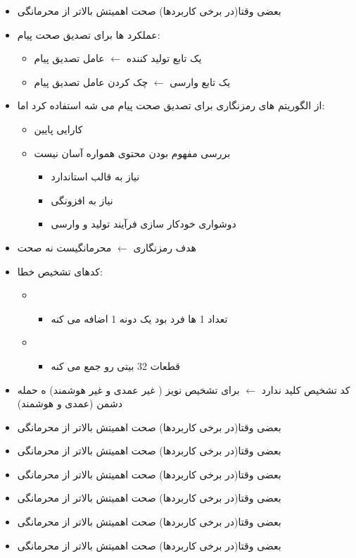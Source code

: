 \documentclass{report}
\begin{document}
	\begin{itemize}
		\item 
		بعضی وقتا(در برخی کاربردها) صحت اهمیتش بالاتر از محرمانگی
		\item 
عملکرد ها برای تصدیق صحت پیام:
			\begin{itemize}
				 \item 
				یک تابع تولید کننده 
				$\leftarrow$
				 عامل تصدیق پیام
				 \item
				 یک تابع وارسی
				 $\leftarrow$
				 چک کردن عامل تصدیق پیام
				
			\end{itemize}
		\item 
			از الگوریتم های رمزنگاری برای تصدیق صحت پیام می شه استفاده کرد اما:
				\begin{itemize}
					\item 
					کارایی پایین
					\item
					 بررسی مفهوم بودن محتوی همواره آسان نیست
					 	\begin{itemize}
					 		\item 
					 		نیاز به قالب استاندارد
					 		\item 
					 		نیاز به افزونگی
					 		\item 
					 		دوشواری خودکار سازی فرآیند تولید و وارسی
					 	\end{itemize}
				\end{itemize}
		\item 
			هدف رمزنگاری
			$\leftarrow$
			محرمانگیست نه صحت
		\item 
			کدهای تشخیص خطا:
			\begin{itemize}
				\item {}	
					\begin{itemize}
						\item 
						تعداد 1 ها فرد بود یک دونه 1 اضافه می کنه
					\end{itemize}
				\item {}
					\begin{itemize}
						\item 
						قطعات 32 بیتی رو جمع می کنه
					\end{itemize}
			\end{itemize}
		\item 
		کد تشخیص کلید ندارد
		$\leftarrow$
		برای تشخیص نویز ( غیر عمدی و غیر هوشمند) ه حمله دشمن (عمدی و هوشمند)
		\item 
			بعضی وقتا(در برخی کاربردها) صحت اهمیتش بالاتر از محرمانگی
		\item 
			بعضی وقتا(در برخی کاربردها) صحت اهمیتش بالاتر از محرمانگی
		\item 
			بعضی وقتا(در برخی کاربردها) صحت اهمیتش بالاتر از محرمانگی
		\item 
			بعضی وقتا(در برخی کاربردها) صحت اهمیتش بالاتر از محرمانگی
		\item 
			بعضی وقتا(در برخی کاربردها) صحت اهمیتش بالاتر از محرمانگی
		\item 
			بعضی وقتا(در برخی کاربردها) صحت اهمیتش بالاتر از محرمانگی
			
	\end{itemize}
\end{document}
